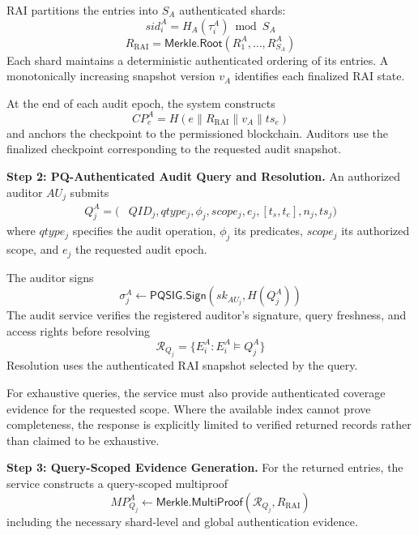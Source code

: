 \documentclass[lettersize,journal]{IEEEtran}
\begin{document}
RAI partitions the entries into $S_A$
authenticated shards:
\begin{equation}
sid_i^A=H_A(\tau_i^A)\bmod S_A
\end{equation}
\begin{equation}
R_{\mathrm{RAI}}=
\mathsf{Merkle.Root}
(R_1^A,\ldots,R_{S_A}^A)
\end{equation}
Each shard maintains a deterministic
authenticated ordering of its entries.
A monotonically increasing snapshot
version $v_A$ identifies each finalized
RAI state.

At the end of each audit epoch, the system
constructs
\begin{equation}
CP_e^A=
H(e\parallel R_{\mathrm{RAI}}
\parallel v_A\parallel ts_e)
\end{equation}
and anchors the checkpoint to the
permissioned blockchain. Auditors use
the finalized checkpoint corresponding
to the requested audit snapshot.

\medskip
\noindent\textbf{Step 2: PQ-Authenticated Audit
Query and Resolution.}
An authorized auditor $AU_j$ submits
\begin{equation}
\begin{aligned}
Q_j^A=\big(
&QID_j,qtype_j,\phi_j,scope_j,e_j,[t_s,t_e],n_j,ts_j\big)
\end{aligned}
\end{equation}
where $qtype_j$ specifies the audit
operation, $\phi_j$ its predicates,
$scope_j$ its authorized scope, and
$e_j$ the requested audit epoch.

The auditor signs
\begin{equation}
\sigma_j^A\leftarrow
\mathsf{PQSIG.Sign}
(sk_{AU_j},H(Q_j^A))
\end{equation}
The audit service verifies the registered
auditor's signature, query freshness,
and access rights before resolving
\begin{equation}
\mathcal{R}_{Q_j}=
\{E_i^A:E_i^A\models Q_j^A\}
\end{equation}
Resolution uses the authenticated RAI
snapshot selected by the query.

For exhaustive queries, the service must
also provide authenticated coverage
evidence for the requested scope. Where
the available index cannot prove
completeness, the response is explicitly
limited to verified returned records
rather than claimed to be exhaustive.

\medskip
\noindent\textbf{Step 3: Query-Scoped Evidence
Generation.}
For the returned entries, the service
constructs a query-scoped multiproof
\begin{equation}
MP_{Q_j}^A\leftarrow
\mathsf{Merkle.MultiProof}
(\mathcal{R}_{Q_j},R_{\mathrm{RAI}})
\end{equation}
including the necessary shard-level
and global authentication evidence.
\end{document}
